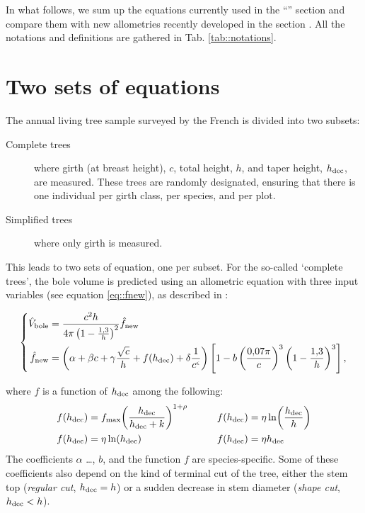 In what follows, we sum up the equations currently used in the ``'' section and compare them with new allometries recently developed \parencite{Gohon2024} in the section . All the notations and definitions are gathered in Tab. \ref{tab::notations}.

\section{Two sets of equations\label{sec::old_allom}}

The annual living tree sample surveyed by the French \NFI{} is divided into two subsets:
\begin{description}
	\item [Complete trees] where girth (at breast height), \( c \), total height, \( h \), and taper height, \( h_{\text{dec}} \), are measured. These trees are randomly designated, ensuring that there is one individual per girth class, per species, and per plot.
	\item [Simplified trees] where only girth is measured.
\end{description}

This leads to two sets of equation, one per subset. For the so-called `complete trees', the bole volume is predicted using an allometric equation with three input variables (see equation \eqref{eq::fnew}), as described in \cite{Morneau2016}:
\begin{fullwidth}
	\begin{equation}
		\left\{
		\begin{aligned}
			\hat{V}_{\text{bole}} &= \frac{c^2 h}{4 \pi \left( 1 - \frac{1{,}3}{h} \right)^2} \hat f_{\text{new}} \\
			\hat f_{\text{new}} &= \left( \alpha + \beta c + \gamma \frac{\sqrt{c}}{h} + f(h_{\text{dec}}) + \delta \frac{1}{c^\epsilon} \right) \left[ 1 - b \left( \frac{0{,}07 \pi}{c} \right)^3 \left( 1 - \frac{1{,}3}{h} \right)^3 \right],
		\end{aligned}
		\right.
		\label{eq::fnew}
	\end{equation}
\end{fullwidth}
where \( f \) is a function of \( h_{\text{dec}} \) among the following:
\begin{alignat*}{2}
f(h_{\text{dec}}) & = f_{\text{max}}\!\left( \frac{h_{\text{dec}}}{h_{\text{dec}} + k} \right)^{1 + \rho} && \qquad f(h_{\text{dec}}) = \eta \ln\!\left( \frac{h_{\text{dec}}}{h} \right) \\
f(h_{\text{dec}}) & = \eta \ln(h_{\text{dec}}) && \qquad f(h_{\text{dec}}) = \eta h_{\text{dec}}
\end{alignat*}
The coefficients \( \alpha \) \dots, \( b \), and the function \( f \) are species-specific. Some of these coefficients also depend on the kind of terminal cut of the tree, either the stem top (\textit{regular cut}, \ie \( h_{\text{dec}} = h \)) or a sudden decrease in stem diameter (\textit{shape cut}, \( h_{\text{dec}} < h\)). \\


